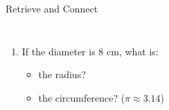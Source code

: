 \documentclass{beamer}
\newcommand{\ashow}[1]{\uncover<2->{\textcolor{red}{\small #1}}}
\begin{document}
\begin{frame}{Retrieve and Connect}
\begin{columns}
\begin{enumerate}
  \item If the diameter is $8$ cm, what is:
    \begin{itemize}
      \item the radius? \ashow{$4$ cm}
      \item the circumference? ($\pi \approx 3.14$) \ashow{$25.12$ cm}
    \end{itemize}
 
\end{enumerate}

\end{columns}
\end{frame}
\end{document}
